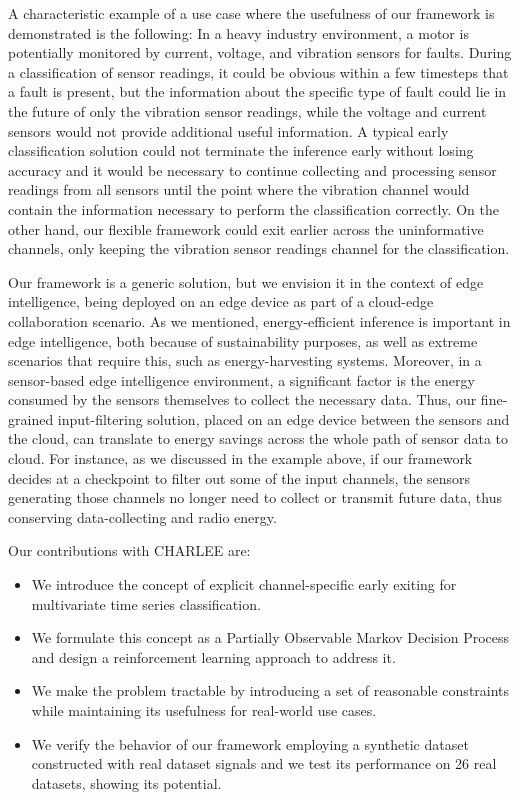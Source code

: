 \documentclass[conference]{IEEEtran}
\begin{document}
A characteristic example of a use case where the usefulness of our framework is demonstrated is the following: In a heavy industry environment, a motor is potentially monitored by current, voltage, and vibration sensors for faults. During a classification of sensor readings, it could be obvious within a few timesteps that a fault is present, but the information about the specific type of fault could lie in the future of only the vibration sensor readings, while the voltage and current sensors would not provide additional useful information. A typical early classification solution could not terminate the inference early without losing accuracy and it would be necessary to continue collecting and processing sensor readings from all sensors until the point where the vibration channel would contain the information necessary to perform the classification correctly. On the other hand, our flexible framework could exit earlier across the uninformative channels, only keeping the vibration sensor readings channel for the classification.

Our framework is a generic solution, but we envision it in the context of edge intelligence, being deployed on an edge device as part of a cloud-edge collaboration scenario. As we mentioned, energy-efficient inference is important in edge intelligence, both because of sustainability purposes, as well as extreme scenarios that require this, such as energy-harvesting systems\cite{gobieski2019intermittent}. Moreover, in a sensor-based edge intelligence environment, a significant factor is the energy consumed by the sensors themselves to collect the necessary data\cite{casare2009energymgmt,kannan2021budgetrnn}. Thus, our fine-grained input-filtering solution, placed on an edge device between the sensors and the cloud, can translate to energy savings across the whole path of sensor data to cloud. For instance, as we discussed in the example above, if our framework decides at a checkpoint to filter out some of the input channels, the sensors generating those channels no longer need to collect or transmit future data, thus conserving data-collecting and radio energy.

Our contributions with CHARLEE are:
\begin{itemize}
    \item We introduce the concept of explicit channel-specific early exiting for multivariate time series classification.
    \item We formulate this concept as a Partially Observable Markov Decision Process and design a reinforcement learning approach to address it.
    \item We make the problem tractable by introducing a set of reasonable constraints while maintaining its usefulness for real-world use cases.
    \item We verify the behavior of our framework employing a synthetic dataset constructed with real dataset signals and we test its performance on 26 real datasets, showing its potential.
\end{itemize}
\end{document}
